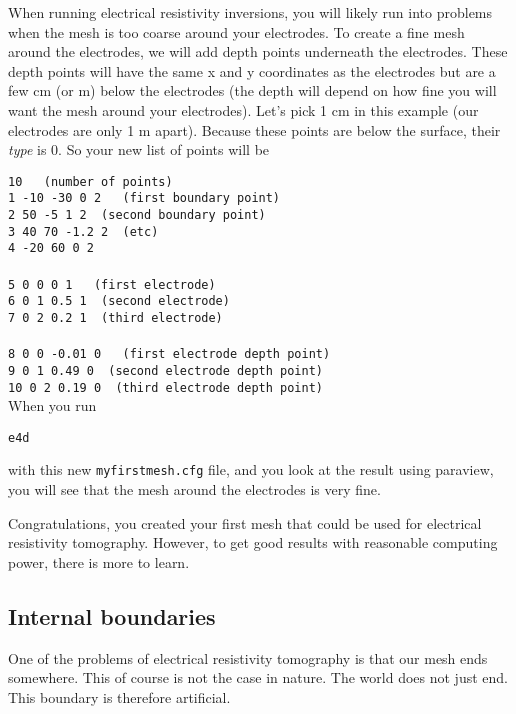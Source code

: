 \documentclass[11pt]{article}
\begin{document}
When running electrical resistivity inversions, you will likely run
into problems when the mesh is too coarse around your electrodes. To
create a fine mesh around the electrodes, we will add depth points
underneath the electrodes. These depth points will have the same x and
y coordinates as the electrodes but are a few cm (or m) below the
electrodes (the depth will depend on how fine you will want the mesh
around your electrodes). Let's pick 1 cm in this example (our
electrodes are only 1 m apart). Because
these points are below the surface, their \emph{type} is 0. So your
new list of points will be

\verb+10   (number of points)+\\
\verb+1 -10 -30 0 2   (first boundary point)+\\
\verb+2 50 -5 1 2  (second boundary point)+\\
\verb+3 40 70 -1.2 2  (etc)+\\
\verb+4 -20 60 0 2+\\
\verb++\\
\verb+5 0 0 0 1   (first electrode)+\\
\verb+6 0 1 0.5 1  (second electrode)+\\
\verb+7 0 2 0.2 1  (third electrode)+\\
\verb++\\
\verb+8 0 0 -0.01 0   (first electrode depth point)+\\
\verb+9 0 1 0.49 0  (second electrode depth point)+\\
\verb+10 0 2 0.19 0  (third electrode depth point)+\\

When you run

\qquad \verb+e4d+

with this new \verb+myfirstmesh.cfg+ file, and you look at the result
using paraview, you will see that the mesh around the electrodes is
very fine.

Congratulations, you created your first mesh that could be used for
electrical resistivity tomography. However, to get good results with
reasonable computing power, there is more to learn.

\subsection{Internal boundaries}

One of the problems of electrical resistivity tomography is that our
mesh ends somewhere. This of course is not the case in nature. The
world does not just end. This boundary is therefore artificial.
\end{document}
